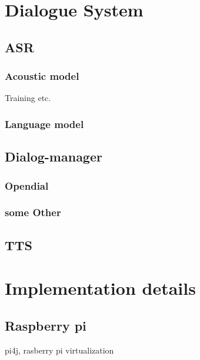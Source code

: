 \documentclass[a4paper, 12pt]{article}
\begin{document}


\pagestyle{empty}

\pagestyle{plain}
\setcounter{page}{1}


\section{Dialogue System}

\subsection{ASR}

\subsubsection{Acoustic model}
Training etc.

\subsubsection{Language model}

%

\subsection{Dialog-manager}

\subsubsection{Opendial}
\subsubsection{some Other}

\subsection{TTS}

\section{Implementation details}
\subsection{Raspberry pi}
pi4j, rasberry pi virtualization
\end{document}
